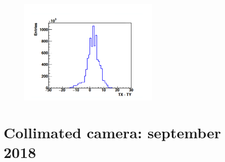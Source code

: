 \begin{figure}[!htbp]
\centering
\includegraphics[width=0.6\textwidth]{03_GraphicFiles/chapter6_BeamTests/Nice_May2018/TX-TY.png}
\caption{}
\label{chap6::fig::May_HodoDeltaTFibers}
\end{figure}



\section{Collimated camera: september 2018}


\clearpage
